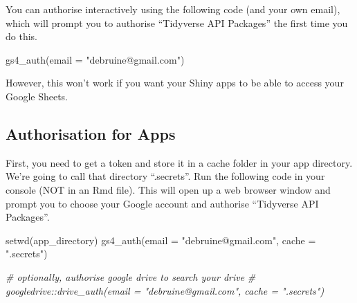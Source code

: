 \documentclass[
]{book}
\newenvironment{Shaded}{\begin{snugshade}}{\end{snugshade}}
\newcommand{\AttributeTok}[1]{\textcolor[rgb]{0.77,0.63,0.00}{#1}}
\newcommand{\CommentTok}[1]{\textcolor[rgb]{0.56,0.35,0.01}{\textit{#1}}}
\newcommand{\FunctionTok}[1]{\textcolor[rgb]{0.00,0.00,0.00}{#1}}
\newcommand{\NormalTok}[1]{#1}
\newcommand{\StringTok}[1]{\textcolor[rgb]{0.31,0.60,0.02}{#1}}
\begin{document}
You can authorise interactively using the following code (and your own email), which will prompt you to authorise ``Tidyverse API Packages'' the first time you do this.

\begin{Shaded}
\begin{Highlighting}[]
\FunctionTok{gs4\_auth}\NormalTok{(}\AttributeTok{email =} \StringTok{"debruine@gmail.com"}\NormalTok{)}
\end{Highlighting}
\end{Shaded}

However, this won't work if you want your Shiny apps to be able to access your Google Sheets.

\hypertarget{authorisation-for-apps}{%
\subsection{Authorisation for Apps}\label{authorisation-for-apps}}

First, you need to get a token and store it in a cache folder in your app directory. We're going to call that directory ``.secrets''. Run the following code in your console (NOT in an Rmd file). This will open up a web browser window and prompt you to choose your Google account and authorise ``Tidyverse API Packages''.

\begin{Shaded}
\begin{Highlighting}[]
\FunctionTok{setwd}\NormalTok{(app\_directory)}
\FunctionTok{gs4\_auth}\NormalTok{(}\AttributeTok{email =} \StringTok{"debruine@gmail.com"}\NormalTok{, }\AttributeTok{cache =} \StringTok{".secrets"}\NormalTok{)}

\CommentTok{\# optionally, authorise google drive to search your drive}
\CommentTok{\# googledrive::drive\_auth(email = "debruine@gmail.com", cache = ".secrets")}
\end{Highlighting}
\end{Shaded}
\end{document}
